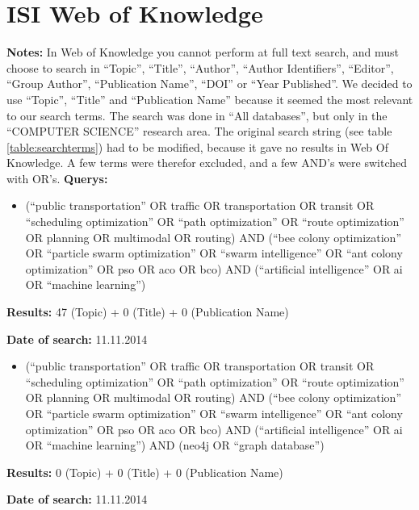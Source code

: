 \section{ISI Web of Knowledge}
\par \textbf{Notes:} In Web of Knowledge you cannot perform at full text search, and must choose to search in ``Topic'', ``Title'', ``Author'', ``Author Identifiers'', ``Editor'', ``Group Author'', ``Publication Name'', ``DOI'' or ``Year Published''. We decided to use ``Topic'', ``Title'' and ``Publication Name'' because it seemed the most relevant to our search terms. The search was done in ``All databases'', but only in the ``COMPUTER SCIENCE'' research area. The original search string (see table \ref{table:searchterms}) had to be modified, because it gave no results in Web Of Knowledge. A few terms were therefor excluded, and a few AND's were switched with OR's. 
\newline
\newline
\textbf{Querys:}
\begin{itemize}
	\item (``public transportation'' OR traffic OR transportation OR transit OR ``scheduling optimization'' OR ``path optimization'' OR ``route optimization'' OR planning OR multimodal OR routing) AND (``bee colony optimization'' OR ``particle swarm optimization'' OR ``swarm intelligence'' OR ``ant colony optimization'' OR pso OR aco OR bco) AND (``artificial intelligence'' OR ai OR ``machine learning'')
\end{itemize}
\par \textbf{Results:} 47 (Topic) + 0 (Title) + 0 (Publication Name)
\par \textbf{Date of search:} 11.11.2014
\begin{itemize}
	\item (``public transportation'' OR traffic OR transportation OR transit OR ``scheduling optimization'' OR ``path optimization'' OR ``route optimization'' OR planning OR multimodal OR routing) AND (``bee colony optimization'' OR ``particle swarm optimization'' OR ``swarm intelligence'' OR ``ant colony optimization'' OR pso OR aco OR bco) AND (``artificial intelligence'' OR ai OR ``machine learning'') AND (neo4j OR ``graph database'')
\end{itemize}
\par \textbf{Results:} 0 (Topic) + 0 (Title) + 0 (Publication Name)
\par \textbf{Date of search:} 11.11.2014

